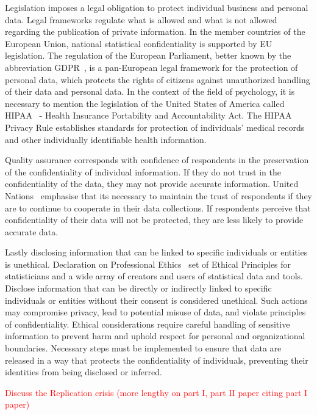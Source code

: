 \documentclass{article}
\begin{document}
Legislation imposes a legal obligation to protect individual business and personal data. Legal frameworks regulate what is allowed and what is not allowed regarding the publication of private information. In the member countries of the European Union, national statistical confidentiality is supported by EU legislation. The regulation of the European Parliament, better known by the abbreviation GDPR~\cite{2016_EU_2016/679}, is a pan-European legal framework for the protection of personal data, which protects the rights of citizens against unauthorized handling of their data and personal data.
In the context of the field of psychology, it is necessary to mention the legislation of the United States of America called HIPAA~\cite{1996_HIPAA} - Health Insurance Portability and Accountability Act.
The HIPAA Privacy Rule establishes standards for protection of individuals' medical records and other individually identifiable health information.

Quality assurance corresponds with confidence of respondents in the preservation of the confidentiality of individual information. If they do not trust in the confidentiality of the data, they may not provide accurate information. United Nations~\cite{2007_UN} emphasise that its necessary to maintain the trust of respondents if they are to continue to cooperate in their data collections. If respondents perceive that confidentiality of their data will not be protected, they are less likely to provide accurate data. 

Lastly disclosing information that can be linked to specific individuals or entities is unethical. Declaration on Professional Ethics~\cite{2010_ISI} set of Ethical Principles for statisticians and a wide array of creators and users of statistical data and tools. 
Disclose information that can be directly or indirectly linked to specific individuals or entities without their consent is considered unethical. Such actions may compromise privacy, lead to potential misuse of data, and violate principles of confidentiality. Ethical considerations require careful handling of sensitive information to prevent harm and uphold respect for personal and organizational boundaries. Necessary steps must be implemented to ensure that data are released in a way that protects the confidentiality of individuals, preventing their identities from being disclosed or inferred.
\newline

\textcolor{red}{Discuss the Replication crisis (more lengthy on part I, part II paper citing part I paper)}
\end{document}

